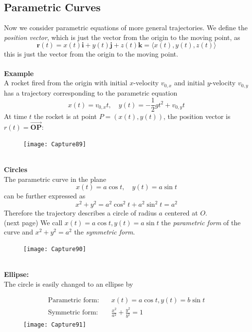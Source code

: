 \documentclass{report}
\begin{document}
\subsection{Parametric Curves} %
Now we consider parametric equations of more general trajectories. We define the 
\textit{position vector}, which is just the vector from the origin to the moving point, as 
\begin{equation*}
\mathbf{r}(t)=x(t)\mathbf{i}+y(t)\mathbf{j}+
z(t)\mathbf{k}=\langle x(t),y(t),z(t)\rangle
\end{equation*}
this is just the vector from the origin to the moving point.\\
\vspace{1mm}\\
\textbf{Example}\\
A rocket fired from the origin with initial $x$-velocity $v_{0,x}$ and initial 
$y$-velocity $v_{0,y}$ has a trajectory corresponding to the parametric equation
\begin{equation*}
x(t)=v_{0,x}t,\quad y(t)=-\frac{1}{2}gt^2+v_{0,y}t
\end{equation*}
At time $t$ the rocket is at point $P=(x(t),y(t))$, the position vector is $r(t)
=\overrightarrow{\mathbf{OP}}$:
\begin{figure}[h]
\texttt{[image: Capture89]}\\
\centering
\end{figure}\\
\textbf{Circles}\\
The parametric curve in the plane
\begin{equation*}
x(t)=a\cos t,\quad y(t)=a\sin t
\end{equation*}
can be further expressed as 
\begin{equation*}
x^2+y^2=a^2\cos^2t+a^2\sin^2t=a^2
\end{equation*}
Therefore the trajectory describes a circle of radius $a$ centered at $O$.\\
(next page)
\newpage
\noindent We call $x(t)=a\cos t,y(t)=a\sin t$ the \textit{parametric form} of the curve and 
$x^2+y^2=a^2$ the \textit{symmetric form}. 
\begin{figure}[h]
\texttt{[image: Capture90]}\\
\centering
\end{figure}\\
\textbf{Ellipse:}\\
The circle is easily changed to an ellipse by
\begin{figure}[h]
\begin{align*}
\text{Parametric form:}&\quad x(t)=a\cos t,y(t)=b\sin t\\
\text{Symmetric form:}&\quad\frac{x^2}{a^2}+\frac{y^2}{b^2}=1
\end{align*}
\texttt{[image: Capture91]}\\
\centering
\end{figure}
\newpage
\end{document}
